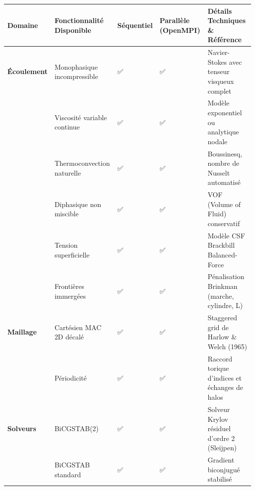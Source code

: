\documentclass[
  french,
]{article}
\newcounter{none} %
\begin{document}
{\def\LTcaptype{none} %
\begin{longtable}[]{@{}
  >{\raggedright\arraybackslash}p{}
  >{\raggedright\arraybackslash}p{}
  >{\centering\arraybackslash}p{}
  >{\centering\arraybackslash}p{}
  >{\raggedright\arraybackslash}p{}@{}}
\toprule\noalign{}
\begin{minipage}[b]{\linewidth}\raggedright
Domaine
\end{minipage} & \begin{minipage}[b]{\linewidth}\raggedright
Fonctionnalité Disponible
\end{minipage} & \begin{minipage}[b]{\linewidth}\centering
Séquentiel
\end{minipage} & \begin{minipage}[b]{\linewidth}\centering
Parallèle (OpenMPI)
\end{minipage} & \begin{minipage}[b]{\linewidth}\raggedright
Détails Techniques \& Référence
\end{minipage} \\
\midrule\noalign{}
\endhead
\bottomrule\noalign{}
\endlastfoot
\textbf{Écoulement} & Monophasique incompressible & ✅ & ✅ &
Navier-Stokes avec tenseur visqueux complet \\
& Viscosité variable continue & ✅ & ✅ & Modèle exponentiel ou
analytique nodale \\
& Thermoconvection naturelle & ✅ & ✅ & Boussinesq, nombre de Nusselt
automatisé \\
& Diphasique non miscible & ✅ & ✅ & VOF (Volume of Fluid)
conservatif \\
& Tension superficielle & ✅ & ✅ & Modèle CSF Brackbill
Balanced-Force \\
& Frontières immergées & ✅ & ✅ & Pénalisation Brinkman (marche,
cylindre, L) \\
\textbf{Maillage} & Cartésien MAC 2D décalé & ✅ & ✅ & Staggered grid
de Harlow \& Welch (1965) \\
& Périodicité & ✅ & ✅ & Raccord torique d'indices et échanges de
halos \\
\textbf{Solveurs} & BiCGSTAB(2) & ✅ & ✅ & Solveur Krylov résiduel
d'ordre 2 (Sleijpen) \\
& BiCGSTAB standard & ✅ & ✅ & Gradient biconjugué stabilisé \\

\end{longtable}}
\end{document}
